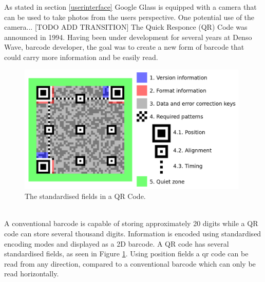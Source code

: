 As stated in section \ref{userinterface} Google Glass is equipped with a camera that can be used to take photos from the users perspective. One potential use of the camera... [TODO ADD TRANSITION] The Quick Responce (QR) Code was announced in 1994. Having been under development for several years at Denso Wave, barcode developer, the goal was to create a new form of barcode that could carry more information and be easily read.\cite{qrCodeHistory}
\\
	\begin{figure}[ht!]
		\centering
		\includegraphics[width=110mm]{images/qrcodestandard}
		\caption{The standardised fields in a QR Code.\cite{qrCodeWiki}}
		\label{qrcodestandard}
	\end{figure}
\\	
A conventional barcode is capable of storing approximately 20 digits while a QR code can store several thousand digits.\cite{qrCodeType} Information is encoded using standardised encoding modes and displayed as a 2D barcode. A QR code has several standardised fields, as seen in Figure \ref{qrcodestandard}. Using position fields a qr code can be read from any direction, compared to a conventional barcode which can only be read horizontally.\cite{qrCodeAbout}